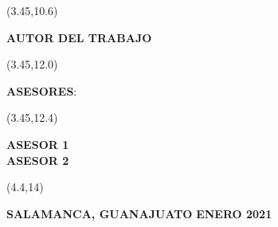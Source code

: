 \begin{textblock}{12}(3.45,10.6)
	\begin{center} \Large{\textbf{AUTOR DEL TRABAJO}} \end{center}
\end{textblock}

\begin{textblock}{12}(3.45,12.0)
	\begin{center} \textbf{ASESORES}: \end{center}
\end{textblock}

\begin{textblock}{12}(3.45,12.4)
	\begin{center} \large{\textbf{ASESOR 1}}\\
		\large{\textbf{ASESOR 2}} \end{center}
\end{textblock}

\begin{textblock}{9.5}(4.4,14)
	\begin{center} \textbf{SALAMANCA, GUANAJUATO }\hspace{1in} \textbf{ENERO 2021} \end{center}
\end{textblock}
\newpage
%